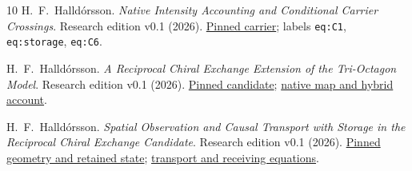 \begin{thebibliography}{10}
H.~F.~Halldórsson.
\emph{Native Intensity Accounting and Conditional Carrier Crossings}.
Research edition v0.1 (2026).
\href{https://github.com/pzychozen/trioctagon-physics/blob/ca22652dc000ca2b16419c1af4167918eab1ae94/papers/NATIVE_INTENSITY_AND_CONDITIONAL_CARRIER_CROSSINGS/publication/v0.1/manuscript/carrier.tex}{Pinned carrier}; labels \texttt{eq:C1}, \texttt{eq:storage}, \texttt{eq:C6}.

H.~F.~Halldórsson.
\emph{A Reciprocal Chiral Exchange Extension of the Tri-Octagon Model}.
Research edition v0.1 (2026).
\href{https://github.com/pzychozen/trioctagon-physics/blob/ca22652dc000ca2b16419c1af4167918eab1ae94/papers/RECIPROCAL_CHIRAL_EXCHANGE/publication/v0.1/manuscript/candidate.tex}{Pinned candidate};
\href{https://github.com/pzychozen/trioctagon-physics/blob/ca22652dc000ca2b16419c1af4167918eab1ae94/papers/RECIPROCAL_CHIRAL_EXCHANGE/publication/v0.1/manuscript/hybrid.tex}{native map and hybrid account}.

H.~F.~Halldórsson.
\emph{Spatial Observation and Causal Transport with Storage in the Reciprocal Chiral Exchange Candidate}.
Research edition v0.1 (2026).
\href{https://github.com/pzychozen/trioctagon-physics/blob/ca22652dc000ca2b16419c1af4167918eab1ae94/papers/SPATIAL_WORK_CAUSAL_TRANSPORT/publication/v0.1/sections/02_setting.tex}{Pinned geometry and retained state};
\href{https://github.com/pzychozen/trioctagon-physics/blob/ca22652dc000ca2b16419c1af4167918eab1ae94/papers/SPATIAL_WORK_CAUSAL_TRANSPORT/publication/v0.1/sections/05_transport.tex}{transport and receiving equations}.
\end{thebibliography}
